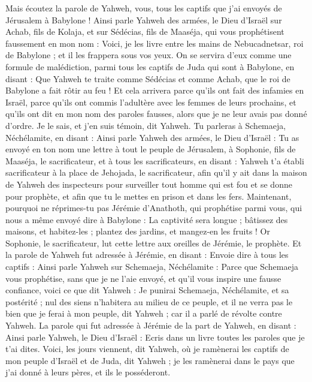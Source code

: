 \begin{multicols}{2}
Mais écoutez la parole de Yahweh, vous, tous les captifs que j'ai envoyés de Jérusalem à Babylone !
Ainsi parle Yahweh des armées, le Dieu d'Israël sur Achab, fils de Kolaja, et sur Sédécias, fils de Maaséja, qui vous prophétisent faussement en mon nom : Voici, je les livre entre les mains de Nebucadnetsar, roi de Babylone ; et il les frappera sous vos yeux.
On se servira d'eux comme une formule de malédiction, parmi tous les captifs de Juda qui sont à Babylone, en disant : Que Yahweh te traite comme Sédécias et comme Achab, que le roi de Babylone a fait rôtir au feu !
Et cela arrivera parce qu'ils ont fait des infamies en Israël, parce qu'ils ont commis l’adultère avec les femmes de leurs prochains, et qu'ils ont dit en mon nom des paroles fausses, alors que je ne leur avais pas donné d’ordre. Je le sais, et j'en suis témoin, dit Yahweh.
Tu parleras à Schemaeja, Néchélamite, en disant :
Ainsi parle Yahweh des armées, le Dieu d'Israël : Tu as envoyé en ton nom une lettre à tout le peuple de Jérusalem, à Sophonie, fils de Maaséja, le sacrificateur, et à tous les sacrificateurs, en disant :
Yahweh t'a établi sacrificateur à la place de Jehojada, le sacrificateur, afin qu’il y ait dans la maison de Yahweh des inspecteurs pour surveiller tout homme qui est fou et se donne pour prophète, et afin que tu le mettes en prison et dans les fers.
Maintenant, pourquoi ne réprimes-tu pas Jérémie d’Anathoth, qui prophétise parmi vous,
qui nous a même envoyé dire à Babylone : La captivité sera longue ; bâtissez des maisons, et habitez-les ; plantez des jardins, et mangez-en les fruits !
Or Sophonie, le sacrificateur, lut cette lettre aux oreilles de Jérémie, le prophète.
Et la parole de Yahweh fut adressée à Jérémie, en disant :
Envoie dire à tous les captifs : Ainsi parle Yahweh sur Schemaeja, Néchélamite : Parce que Schemaeja vous prophétise, sans que je ne l'aie envoyé, et qu’il vous inspire une fausse confiance,
voici ce que dit Yahweh : Je punirai Schemaeja, Néchélamite, et sa postérité ; nul des siens n’habitera au milieu de ce peuple, et il ne verra pas le bien que je ferai à mon peuple, dit Yahweh ; car il a parlé de révolte contre Yahweh.
\VerseOne{}La parole qui fut adressée à Jérémie de la part de Yahweh, en disant :
Ainsi parle Yahweh, le Dieu d'Israël : Ecris dans un livre toutes les paroles que je t'ai dites.
Voici, les jours viennent, dit Yahweh, où je ramènerai les captifs de mon peuple d'Israël et de Juda, dit Yahweh ; je les ramènerai dans le  pays que j'ai donné à leurs pères, et ils le posséderont.

\end{multicols}
